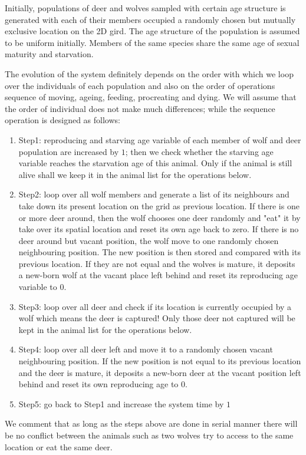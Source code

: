 \documentclass[a4paper,12pt]{article}
\begin{document}
Initially, populations of deer and wolves sampled with certain age structure is generated with each of their members occupied a randomly chosen but mutually exclusive location on the 2D gird. The age structure of the population is assumed to be uniform initially. Members of the same species share the same age of sexual maturity and starvation. 

The evolution of the system definitely depends on the order with which we loop over the individuals of each population and also on the order of operations sequence of moving, ageing, feeding, procreating and dying. We will assume that the order of individual does not make much differences; while the sequence operation is designed as follows:

\begin{enumerate}
\item Step1: reproducing and starving age variable of each member of wolf and deer population are increased by $1$; then we check whether the starving age variable reaches the starvation age of this animal. Only if the animal is still alive shall we keep it in the animal list for the operations below.
\item Step2: loop over all wolf members and generate a list of its neighbours and take down its present location on the grid as previous location. If there is one or more deer around, then the wolf chooses one deer randomly and "eat" it by take over its spatial location and reset its own age back to zero. If there is no deer around but vacant position, the wolf move to one randomly chosen neighbouring position. The new position is then stored and compared with its previous location. If they are not equal and the wolves is mature, it deposits a new-born wolf at the vacant place left behind and reset its reproducing age variable to 0.
\item Step3: loop over all deer and check if its location is currently occupied by a wolf which means the deer is captured! Only those deer not captured will be kept in the animal list for the operations below.
\item Step4: loop over all deer left and move it to a randomly chosen vacant neighbouring position. If the new position is not equal to its previous location and the deer is mature, it deposits a new-born deer at the vacant position left behind and reset its own reproducing age to 0.
\item Step5: go back to Step1 and increase the system time by $1$
\end{enumerate}
We comment that as long as the steps above are done in serial manner there will be no conflict between the animals such as two wolves try to access to the same location or eat the same deer. 
\end{document}
